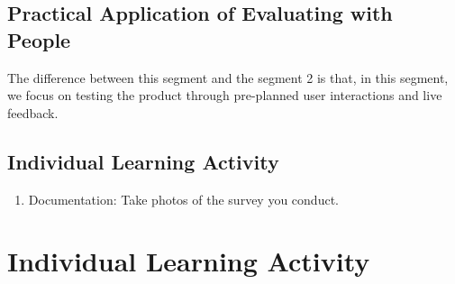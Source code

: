 \documentclass[math,code]{amznotes}
\theoremstyle{remark}
\begin{document}
\subsection{Practical Application of Evaluating with People}
The difference between this segment and the segment 2 is that, in this segment, we focus on testing the product through pre-planned user interactions and live feedback.
\subsection{Individual Learning Activity}
\begin{enumerate}
    \item Documentation: Take photos of the survey you conduct.
\end{enumerate}
\section{Individual Learning Activity}
\end{document}
